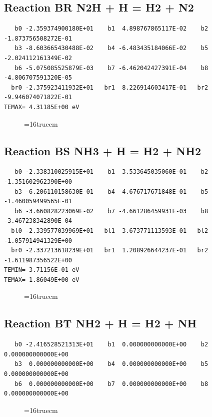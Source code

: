 \documentclass[12pt,dvipdfm]{article}
\begin{document}
\subsection{
Reaction BR N2H + H = H2 + N2  }
\begin{small}\begin{verbatim}
   b0 -2.359374900180E+01    b1  4.898767865117E-02    b2 -1.873756508272E-01
   b3 -8.603665430488E-02    b4 -6.483435184066E-02    b5 -2.024112161349E-02
   b6 -5.075085525879E-03    b7 -6.462042427391E-04    b8 -4.806707591320E-05
  br0 -2.375923411932E+01   br1  8.226914603417E-01   br2 -9.946074071822E-01
TEMAX= 4.31185E+00 eV
   \end{verbatim}\end{small}
\begin{figure}[h!]
\label{n2rates}
\epsfxsize=16truecm
\end{figure}
\newpage

\subsection{
Reaction BS NH3 + H = H2 + NH2 }
\begin{small}\begin{verbatim}
   b0 -2.338310025915E+01    b1  3.533645035060E-01    b2 -1.351602962390E+00
   b3 -6.206110158630E-01    b4 -4.676717671848E-01    b5 -1.460059499565E-01
   b6 -3.660828223069E-02    b7 -4.661286459931E-03    b8 -3.467238342890E-04
  bl0 -2.339577039969E+01   bl1  3.673771113593E-01   bl2 -1.057914941329E+00
  br0 -2.337213618239E+01   br1  1.208926644237E-01   br2 -1.611987356522E+00
TEMIN= 3.71156E-01 eV
TEMAX= 1.86049E+00 eV
   \end{verbatim}\end{small}
\begin{figure}[h!]
\label{n2rates}
\epsfxsize=16truecm
\end{figure}
\newpage

\subsection{
Reaction BT NH2 + H = H2 + NH}
\begin{small}\begin{verbatim}
   b0 -2.416528521313E+01    b1  0.000000000000E+00    b2  0.000000000000E+00
   b3  0.000000000000E+00    b4  0.000000000000E+00    b5  0.000000000000E+00
   b6  0.000000000000E+00    b7  0.000000000000E+00    b8  0.000000000000E+00
   \end{verbatim}\end{small}
\begin{figure}[h!]
\label{n2rates}
\epsfxsize=16truecm
\end{figure}
\newpage
\end{document}

